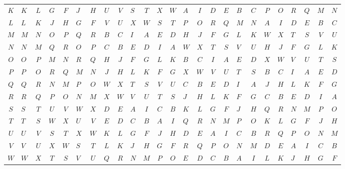 \documentclass[../key.tex]{subfiles}
\begin{document}
\begin{figure}[h]
\begin{center}
\begin{minipage}[b]{\textwidth}
\begin{tabular}{c|acccacccacccacccacccaccc}
				$K$ & $K$ & $L$ & $G$ & $F$ & $J$ & $H$ & $U$ & $V$ & $S$ & $T$ & $X$ & $W$ & $A$ & $I$ & $D$ & $E$ & $B$ & $C$ & $P$ & $O$ & $R$ & $Q$ & $M$ & $N$ \\
				$L$ & $L$ & $K$ & $J$ & $H$ & $G$ & $F$ & $V$ & $U$ & $X$ & $W$ & $S$ & $T$ & $P$ & $O$ & $R$ & $Q$ & $M$ & $N$ & $A$ & $I$ & $D$ & $E$ & $B$ & $C$ \\
				$M$ & $M$ & $N$ & $O$ & $P$ & $Q$ & $R$ & $B$ & $C$ & $I$ & $A$ & $E$ & $D$ & $H$ & $J$ & $F$ & $G$ & $L$ & $K$ & $W$ & $X$ & $T$ & $S$ & $V$ & $U$ \\
				$N$ & $N$ & $M$ & $Q$ & $R$ & $O$ & $P$ & $C$ & $B$ & $E$ & $D$ & $I$ & $A$ & $W$ & $X$ & $T$ & $S$ & $V$ & $U$ & $H$ & $J$ & $F$ & $G$ & $L$ & $K$ \\
				$O$ & $O$ & $P$ & $M$ & $N$ & $R$ & $Q$ & $H$ & $J$ & $F$ & $G$ & $L$ & $K$ & $B$ & $C$ & $I$ & $A$ & $E$ & $D$ & $X$ & $W$ & $V$ & $U$ & $T$ & $S$ \\
				$P$ & $P$ & $O$ & $R$ & $Q$ & $M$ & $N$ & $J$ & $H$ & $L$ & $K$ & $F$ & $G$ & $X$ & $W$ & $V$ & $U$ & $T$ & $S$ & $B$ & $C$ & $I$ & $A$ & $E$ & $D$ \\
				$Q$ & $Q$ & $R$ & $N$ & $M$ & $P$ & $O$ & $W$ & $X$ & $T$ & $S$ & $V$ & $U$ & $C$ & $B$ & $E$ & $D$ & $I$ & $A$ & $J$ & $H$ & $L$ & $K$ & $F$ & $G$ \\
				$R$ & $R$ & $Q$ & $P$ & $O$ & $N$ & $M$ & $X$ & $W$ & $V$ & $U$ & $T$ & $S$ & $J$ & $H$ & $L$ & $K$ & $F$ & $G$ & $C$ & $B$ & $E$ & $D$ & $I$ & $A$ \\
				$S$ & $S$ & $T$ & $U$ & $V$ & $W$ & $X$ & $D$ & $E$ & $A$ & $I$ & $C$ & $B$ & $K$ & $L$ & $G$ & $F$ & $J$ & $H$ & $Q$ & $R$ & $N$ & $M$ & $P$ & $O$ \\
				$T$ & $T$ & $S$ & $W$ & $X$ & $U$ & $V$ & $E$ & $D$ & $C$ & $B$ & $A$ & $I$ & $Q$ & $R$ & $N$ & $M$ & $P$ & $O$ & $K$ & $L$ & $G$ & $F$ & $J$ & $H$ \\
				$U$ & $U$ & $V$ & $S$ & $T$ & $X$ & $W$ & $K$ & $L$ & $G$ & $F$ & $J$ & $H$ & $D$ & $E$ & $A$ & $I$ & $C$ & $B$ & $R$ & $Q$ & $P$ & $O$ & $N$ & $M$ \\
				$V$ & $V$ & $U$ & $X$ & $W$ & $S$ & $T$ & $L$ & $K$ & $J$ & $H$ & $G$ & $F$ & $R$ & $Q$ & $P$ & $O$ & $N$ & $M$ & $D$ & $E$ & $A$ & $I$ & $C$ & $B$ \\
				$W$ & $W$ & $X$ & $T$ & $S$ & $V$ & $U$ & $Q$ & $R$ & $N$ & $M$ & $P$ & $O$ & $E$ & $D$ & $C$ & $B$ & $A$ & $I$ & $L$ & $K$ & $J$ & $H$ & $G$ & $F$ \\

\end{tabular}
\end{minipage}
\end{center}
\end{figure}
\end{document}
